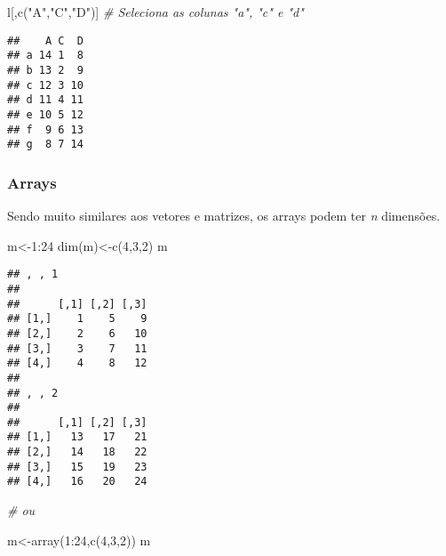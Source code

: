 \documentclass[
]{book}
\newenvironment{Shaded}{\begin{snugshade}}{\end{snugshade}}
\newcommand{\CommentTok}[1]{\textcolor[rgb]{0.56,0.35,0.01}{\textit{#1}}}
\newcommand{\DecValTok}[1]{\textcolor[rgb]{0.00,0.00,0.81}{#1}}
\newcommand{\FunctionTok}[1]{\textcolor[rgb]{0.00,0.00,0.00}{#1}}
\newcommand{\NormalTok}[1]{#1}
\newcommand{\OtherTok}[1]{\textcolor[rgb]{0.56,0.35,0.01}{#1}}
\newcommand{\SpecialCharTok}[1]{\textcolor[rgb]{0.00,0.00,0.00}{#1}}
\newcommand{\StringTok}[1]{\textcolor[rgb]{0.31,0.60,0.02}{#1}}
\begin{document}
\begin{Shaded}
\begin{Highlighting}[]
\NormalTok{l[,}\FunctionTok{c}\NormalTok{(}\StringTok{"A"}\NormalTok{,}\StringTok{"C"}\NormalTok{,}\StringTok{"D"}\NormalTok{)] }\CommentTok{\# Seleciona as colunas "a", "c" e "d"}
\end{Highlighting}
\end{Shaded}

\begin{verbatim}
##    A C  D
## a 14 1  8
## b 13 2  9
## c 12 3 10
## d 11 4 11
## e 10 5 12
## f  9 6 13
## g  8 7 14
\end{verbatim}

\hypertarget{arrays}{%
\subsubsection{Arrays}\label{arrays}}

Sendo muito similares aos vetores e matrizes, os arrays podem ter \emph{n} dimensões.

\begin{Shaded}
\begin{Highlighting}[]
\NormalTok{m}\OtherTok{\textless{}{-}}\DecValTok{1}\SpecialCharTok{:}\DecValTok{24}
\FunctionTok{dim}\NormalTok{(m)}\OtherTok{\textless{}{-}}\FunctionTok{c}\NormalTok{(}\DecValTok{4}\NormalTok{,}\DecValTok{3}\NormalTok{,}\DecValTok{2}\NormalTok{)}
\NormalTok{m}
\end{Highlighting}
\end{Shaded}

\begin{verbatim}
## , , 1
## 
##      [,1] [,2] [,3]
## [1,]    1    5    9
## [2,]    2    6   10
## [3,]    3    7   11
## [4,]    4    8   12
## 
## , , 2
## 
##      [,1] [,2] [,3]
## [1,]   13   17   21
## [2,]   14   18   22
## [3,]   15   19   23
## [4,]   16   20   24
\end{verbatim}

\begin{Shaded}
\begin{Highlighting}[]
\CommentTok{\# ou}

\NormalTok{m}\OtherTok{\textless{}{-}}\FunctionTok{array}\NormalTok{(}\DecValTok{1}\SpecialCharTok{:}\DecValTok{24}\NormalTok{,}\FunctionTok{c}\NormalTok{(}\DecValTok{4}\NormalTok{,}\DecValTok{3}\NormalTok{,}\DecValTok{2}\NormalTok{))}
\NormalTok{m}
\end{Highlighting}
\end{Shaded}
\end{document}
